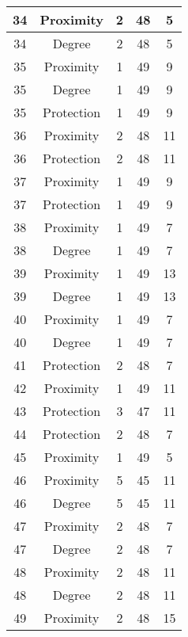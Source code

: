 \documentclass[results.tex]{subfiles}
\begin{document}
\begin{center}
\begin{tabular}{| c || c | c | c | c |}
    34 & Proximity & 2 & 48 & 5 \\ 
    \hline
    34 & Degree & 2 & 48 & 5 \\ 
    \hline
    35 & Proximity & 1 & 49 & 9 \\ 
    \hline
    35 & Degree & 1 & 49 & 9 \\ 
    \hline
    35 & Protection & 1 & 49 & 9 \\ 
    \hline
    36 & Proximity & 2 & 48 & 11 \\ 
    \hline
    36 & Protection & 2 & 48 & 11 \\ 
    \hline
    37 & Proximity & 1 & 49 & 9 \\ 
    \hline
    37 & Protection & 1 & 49 & 9 \\ 
    \hline
    38 & Proximity & 1 & 49 & 7 \\ 
    \hline
    38 & Degree & 1 & 49 & 7 \\ 
    \hline
    39 & Proximity & 1 & 49 & 13 \\ 
    \hline
    39 & Degree & 1 & 49 & 13 \\ 
    \hline
    40 & Proximity & 1 & 49 & 7 \\ 
    \hline
    40 & Degree & 1 & 49 & 7 \\ 
    \hline
    41 & Protection & 2 & 48 & 7 \\ 
    \hline
    42 & Proximity & 1 & 49 & 11 \\ 
    \hline
    43 & Protection & 3 & 47 & 11 \\ 
    \hline
    44 & Protection & 2 & 48 & 7 \\ 
    \hline
    45 & Proximity & 1 & 49 & 5 \\ 
    \hline
    46 & Proximity & 5 & 45 & 11 \\ 
    \hline
    46 & Degree & 5 & 45 & 11 \\ 
    \hline
    47 & Proximity & 2 & 48 & 7 \\ 
    \hline
    47 & Degree & 2 & 48 & 7 \\ 
    \hline
    48 & Proximity & 2 & 48 & 11 \\ 
    \hline
    48 & Degree & 2 & 48 & 11 \\ 
    \hline
    49 & Proximity & 2 & 48 & 15 \\ 
    \hline   \end{tabular}
\end{center}
\end{document}
